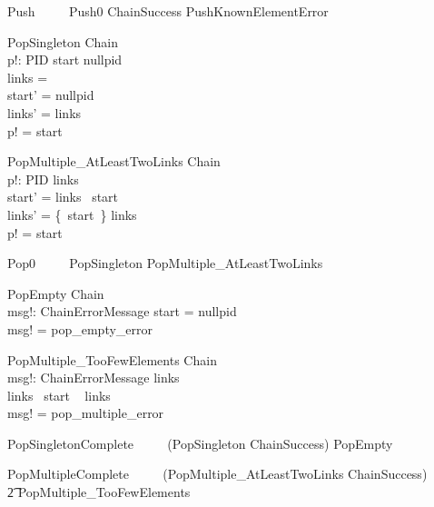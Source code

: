 \begin{zed}
Push ~~~~ Push0 \land  ChainSuccess \lor PushKnownElementError
\end{zed}

\begin{schema}{PopSingleton}
  \Delta Chain\\
  p!: PID
\where
  start \neq  nullpid\\
  links = \emptyset\\
  start' = nullpid\\
  links' = links\\
  p! = start
\end{schema}

\begin{schema}{PopMultiple\_AtLeastTwoLinks}
  \Delta Chain\\
  p!: PID
\where
  links \neq  \emptyset\\
  start' = links~ start\\
  links' = \{~start~\} \ndres  links\\
  p! = start
\end{schema}

\begin{zed}
Pop0 ~~~~ PopSingleton \lor  PopMultiple\_AtLeastTwoLinks
\end{zed}

\begin{schema}{PopEmpty}
  \Xi Chain\\
  msg!: ChainErrorMessage
\where
  start = nullpid\\
  msg! = pop\_empty\_error
\end{schema}

\begin{schema}{PopMultiple\_TooFewElements}
  \Xi Chain\\
  msg!: ChainErrorMessage
\where
  links \neq  \emptyset\\
  links~ start \notin  \dom~  links\\
  msg! = pop\_multiple\_error
\end{schema}

\begin{zed}
PopSingletonComplete ~~~~ (PopSingleton \land  ChainSuccess) \lor  PopEmpty
\end{zed}

\begin{zed}
PopMultipleComplete ~~~~  (PopMultiple\_AtLeastTwoLinks \land  ChainSuccess) \lor  \\
                           \t2 PopMultiple\_TooFewElements
\end{zed}

